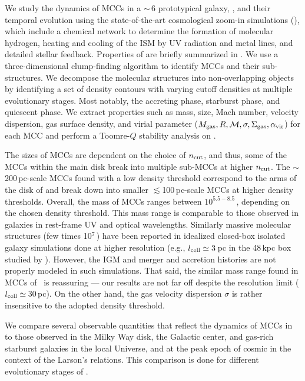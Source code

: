 \IfFileExists{emulateapjlegacy.cls}{\documentclass[iop]{emulateapjlegacy}}{\documentclass[iop]{emulateapj}}
\begin{document}
We study the dynamics of MCCs in a \z$\sim$\,6 prototypical galaxy, \flower,
and their temporal evolution using the state-of-the-art cosmological zoom-in simulations (),
which include a chemical network to determine the formation of molecular hydrogen, heating and cooling of the ISM by
UV radiation and metal lines, and detailed stellar feedback.
Properties of \flower are briefly summarized in .
We use a three-dimensional clump-finding algorithm to identify MCCs and their sub-structures.
We decompose the molecular structures into non-overlapping objects by identifying a set of
density contours with varying cutoff densities at multiple evolutionary stages.
Most notably, the accreting phase, starburst phase, and quiescent phase.
We extract properties such as mass, size, Mach number, velocity
dispersion, gas surface density, and virial parameter ($M_{\rm gas}, R, \mathcal{M},
\sigma, \Sigma_{\rm gas}, \alpha_{\rm vir}$) for each MCC and perform a Toomre-$Q$ stability analysis on \flower.


The sizes of MCCs are dependent on the choice of $n_{\rm cut}$,
and thus, some of the MCCs within the main disk break into multiple sub-MCCs at higher $n_{\rm cut}$.
The $\sim$200\,pc-scale MCCs found with a low density threshold
correspond to the arms of the disk of \flower and break down into smaller $\lesssim$100\,pc-scale MCCs at higher density thresholds.
Overall, the mass of MCCs ranges between $10^{5.5-8.5}$\,\Msun, depending on the chosen density threshold.
This mass range is comparable to those observed in \z{} galaxies in rest-frame UV and optical wavelengths.
Similarly massive molecular structures (few times 10$^7$\,\Msun) have been
reported in idealized closed-box isolated galaxy simulations done at higher resolution (e.g., $l_{\rm cell}\simeq3$\,pc in the
48\,kpc box studied by \citealt{Behrendt16a}).
However, the IGM and merger and accretion histories are not properly modeled in such simulations.
That said, the similar mass range found in MCCs of \flower\ is
reassuring --- our results are not far off despite the resolution limit ($l_{\rm cell}\simeq$\,30\,pc).
On the other hand, the gas velocity dispersion $\sigma$ is rather insensitive to the adopted density threshold.

We compare several observable quantities that reflect the dynamics of MCCs in \flower to those
observed in the Milky Way disk, the Galactic center, and
gas-rich starburst galaxies in the local Universe, and at the peak epoch of cosmic \SF in the context of the Larson's relations.
This comparison is done for different evolutionary stages of \flower.
\end{document}
